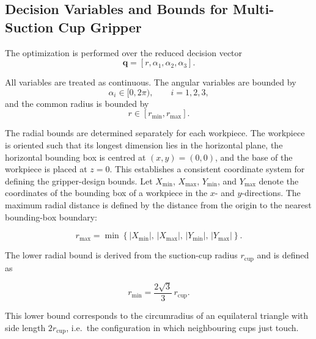 \subsection{Decision Variables and Bounds for Multi-Suction Cup Gripper}

The optimization is performed over the reduced decision vector
\begin{equation}
    \mathbf{q} = [r,\alpha_1,\alpha_2,\alpha_3].
\end{equation}

All variables are treated as continuous. The angular variables are bounded by
\begin{equation}
    \alpha_i \in [0,2\pi), \qquad i=1,2,3,
\end{equation}
and the common radius is bounded by
\begin{equation}
    r \in [r_{\min},r_{\max}].
\end{equation}

The radial bounds are determined separately for each workpiece. The workpiece is oriented such that
its longest dimension lies in the horizontal plane, the horizontal bounding box is centred at
\((x,y)=(0,0)\), and the base of the workpiece is placed at \(z=0\). This establishes a consistent
coordinate system for defining the gripper-design bounds. Let \(X_{\min}\), \(X_{\max}\),
\(Y_{\min}\), and \(Y_{\max}\) denote the coordinates of the bounding box of a workpiece in the
\(x\)- and \(y\)-directions. The maximum radial distance is defined by the distance from the origin
to the nearest bounding-box boundary:

\begin{equation}
    r_{\max}
    =
    \min
    \left\{
        |X_{\min}|,\,
        |X_{\max}|,\,
        |Y_{\min}|,\,
        |Y_{\max}|
    \right\}.
\end{equation}

The lower radial bound is derived from the suction-cup radius \(r_{\mathrm{cup}}\) and is defined as

\begin{equation}
    r_{\min}
    =
    \frac{2\sqrt{3}}{3}\,
    r_{\mathrm{cup}} .
\end{equation}

This lower bound corresponds to the circumradius of an equilateral triangle with side length
\(2r_{\mathrm{cup}}\), i.e.\ the configuration in which neighbouring cups just touch.

